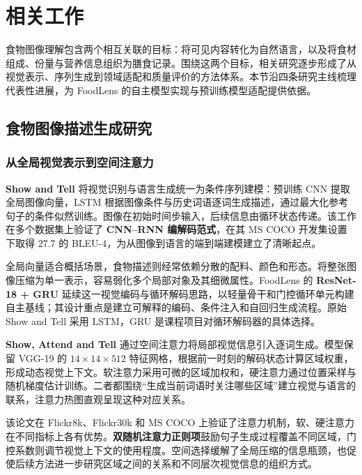 \section{相关工作}
\label{sec:related-work}

食物图像理解包含两个相互关联的目标：将可见内容转化为自然语言，以及将食材组成、份量与营养信息组织为膳食记录。围绕这两个目标，相关研究逐步形成了从视觉表示、序列生成到领域适配和质量评价的方法体系。本节沿四条研究主线梳理代表性进展，为 FoodLens 的自主模型实现与预训练模型适配提供依据。

\subsection{食物图像描述生成研究}
\label{subsec:captioning}

\subsubsection{从全局视觉表示到空间注意力}
\textbf{Show and Tell}\cite{vinyals2015show} 将视觉识别与语言生成统一为条件序列建模：预训练 CNN 提取全局图像向量，LSTM 根据图像条件与历史词语逐词生成描述，通过最大化参考句子的条件似然训练。图像在初始时间步输入，后续信息由循环状态传递。该工作在多个数据集上验证了 \textbf{CNN--RNN 编解码范式}，在其 MS COCO 开发集设置下取得 27.7 的 BLEU-4，为从图像到语言的端到端建模建立了清晰起点。

全局向量适合概括场景，食物描述则经常依赖分散的配料、颜色和形态。将整张图像压缩为单一表示，容易弱化多个局部对象及其细微属性。FoodLens 的 \textbf{ResNet-18 + GRU} 延续这一视觉编码与循环解码思路，以轻量骨干和门控循环单元构建自主基线；其设计重点是建立可解释的编码、条件注入和自回归生成流程。原始 Show and Tell 采用 LSTM，GRU 是课程项目对循环解码器的具体选择。

\textbf{Show, Attend and Tell}\cite{xu2015attend} 通过空间注意力将局部视觉信息引入逐词生成。模型保留 VGG-19 的 $14\times14\times512$ 特征网格，根据前一时刻的解码状态计算区域权重，形成动态视觉上下文。软注意力采用可微的区域加权和，硬注意力通过位置采样与随机梯度估计训练。二者都围绕“生成当前词语时关注哪些区域”建立视觉与语言的联系，注意力热图直观呈现这种对应关系。

该论文在 Flickr8k、Flickr30k 和 MS COCO 上验证了注意力机制，软、硬注意力在不同指标上各有优势。\textbf{双随机注意力正则项}鼓励句子生成过程覆盖不同区域，门控系数则调节视觉上下文的使用程度。空间选择缓解了全局压缩的信息瓶颈，也促使后续方法进一步研究区域之间的关系和不同层次视觉信息的组织方式。

